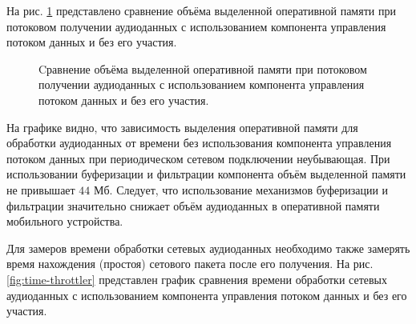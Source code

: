     \par На рис. \ref{fig:ram-throttler} представлено сравнение объёма выделенной оперативной памяти
    при потоковом получении аудиоданных с использованием компонента \newline управления потоком данных и без его участия.

    \begin{figure}[!h]
        \caption{
            Cравнение объёма выделенной оперативной памяти
            при потоковом получении аудиоданных 
            с использованием компонента управления потоком данных и без его участия.
        }
        \label{fig:ram-throttler}
    \end{figure}

    \par На графике видно, что зависимость выделения оперативной памяти для обработки аудиоданных от времени 
    без использования компонента управления потоком данных
    при периодическом сетевом подключении неубывающая.
    При использовании буферизации и фильтрации компонента объём выделенной памяти не привышает $44$ Мб.
    Следует, что использование механизмов буферизации и фильтрации 
    значительно снижает объём аудиоданных в оперативной памяти мобильного устройства.  

    \par Для замеров времени обработки сетевых аудиоданных необходимо также замерять время нахождения (простоя)
    сетового пакета после его получения.
    На рис. \ref{fig:time-throttler} представлен график сравнения времени обработки сетевых аудиоданных
    с использованием компонента управления потоком данных и без его участия.

